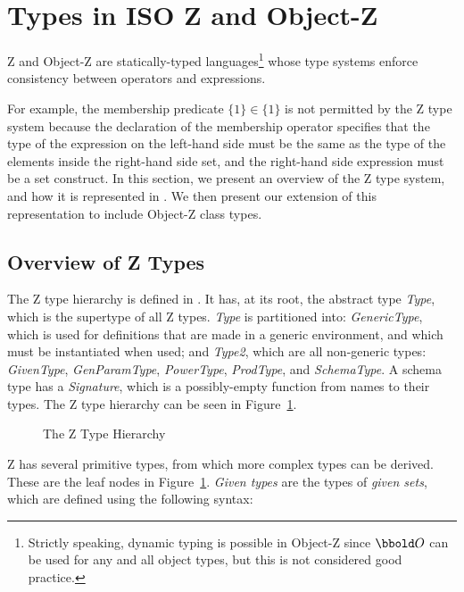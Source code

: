\section{Types in ISO Z and Object-Z}

Z and Object-Z are statically-typed languages\footnote{Strictly
speaking, dynamic typing is possible in Object-Z since $\oid$ can be
used for any and all object types, but this is not considered good
practice.} whose type systems enforce consistency between operators
and expressions.

For example, the membership predicate $\{1\} \in \{1\}$ is not
permitted by the Z type system because the declaration of the
membership operator specifies that the type of the expression on the
left-hand side must be the same as the type of the elements inside the
right-hand side set, and the right-hand side expression must be a set
construct.  In this section, we present an overview of the Z type
system, and how it is represented in \theStandard. We then present
our extension of this representation to include Object-Z class types.

\subsection{Overview of Z Types}

The Z type hierarchy is defined in . It has, at its root,
the abstract type {\em Type}, which is the supertype of all Z
types. {\em Type} is partitioned into: {\em GenericType}, which is
used for definitions that are made in a generic environment, and which
must be instantiated when used; and {\em Type2}, which are all
non-generic types: {\em GivenType}, {\em GenParamType}, {\em
PowerType}, {\em ProdType}, and {\em SchemaType}. A schema type has a
{\em Signature}, which is a possibly-empty function from names to
their types. The Z type hierarchy can be seen in Figure~\ref{z-types}.

\def\epsfsize#1#2{0.7#1}
\begin{figure}
\begin{center}
\end{center}
\caption{The Z Type Hierarchy}
\label{z-types}
\end{figure}
\def\epsfsize#1#2{\epsfxsize}

Z has several primitive types, from which more complex types can be
derived. These are the leaf nodes in Figure~\ref{z-types}. {\em Given
types} are the types of {\em given sets}, which are defined using the
following syntax:
\begin{zed}
  [Resource]
\end{zed}

